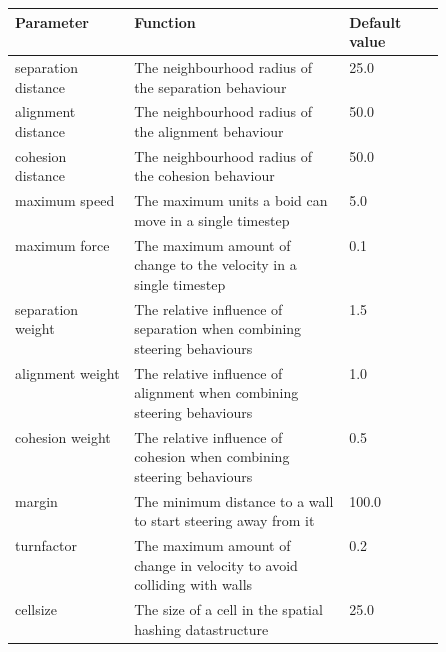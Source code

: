 \documentclass[a4paper, 12pt]{article}
\begin{document}
\begin{table}[H]
    \centering
    \begin{tabular}{lp{0.5\linewidth}l}
        \textbf{Parameter}  & \textbf{Function}                                                                                           & \textbf{Default value} \\ \hline
        separation distance & The neighbourhood radius of the separation behaviour                                                        & 25.0                   \\ \hline
        alignment distance  & The neighbourhood radius of the alignment behaviour                                                         & 50.0                   \\ \hline
        cohesion distance   & The neighbourhood radius of the cohesion behaviour                                                          & 50.0                   \\ \hline
        maximum speed       & The maximum units a boid can move in a single timestep                                                      & 5.0                    \\ \hline
        maximum force       & The maximum amount of change to the velocity in a single timestep                                           & 0.1                    \\ \hline
        separation weight   & The relative influence of separation when combining steering behaviours                                     & 1.5                    \\ \hline
        alignment weight    & The relative influence of alignment when combining steering behaviours                                      & 1.0                    \\ \hline
        cohesion weight     & The relative influence of cohesion when combining steering behaviours                                       & 0.5                    \\ \hline
        margin              & The minimum distance to a wall to start steering away from it                                               & 100.0                  \\ \hline
        turnfactor          & The maximum amount of change in velocity to avoid colliding with walls                                      & 0.2                    \\ \hline
        cellsize            & The size of a cell in the spatial hashing datastructure                                                     & 25.0                   \\ \hline

\end{tabular}
\end{table}
\end{document}
